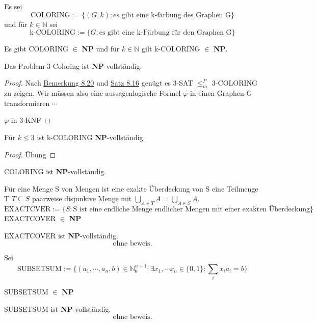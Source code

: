     Es sei 
    \[
        \text{COLORING} := \{(G,k) : \text{es gibt eine k-färbung des Graphen G}\}
    \]
    und für \(k \in \mathbb{N}\) sei
    \[
        \text{k-COLORING} := \{G : \text{es gibt eine k-Färbung für den Graphen G}\}  
    \]

    Es gibt COLORING \(\in\) \textbf{NP} und für \(k \in \mathbb{N}\) gilt k-COLORING \(\in\) \textbf{NP}.

    Das Problem 3-Coloring ist \textbf{NP}-vollständig.
    \begin{proof}
        Nach \hyperref[subsec:8.20]{Bemerkung 8.20} und \hyperref[subsec:8.16]{Satz 8.16} genügt es 3-SAT \(\leq^P_m\) 3-COLORING zu zeigen. Wir müssen also eine aussagenlogische Formel \(\varphi\) in einen Graphen G transformieren \(\cdots\)

        \(\varphi\) in 3-KNF
    \end{proof}

    Für \(k \leq 3\) ist k-COLORING \textbf{NP}-vollständig.
    \begin{proof}
        Übung
    \end{proof}

    COLORING ist \textbf{NP}-vollständig.

    Für eine Menge S von Mengen ist eine exakte Überdeckung von S eine Teilmenge T \(T \subseteq S\) paarweise disjunkive Menge mit \(\bigcup \limits_{A\in T} A = \bigcup \limits_{A \in S} A\). 
    \[
        \text{EXACTCVER} := \{S : \text{S ist eine endliche Menge endlicher Mengen mit einer exakten Überdeckung}\}  
    \]
    EXACTCOVER \(\in\) \textbf{NP}

    EXACTCOVER ist \textbf{NP}-vollständig.
    \[\text{ohne beweis.}\]

    Sei
    \[
        \text{SUBSETSUM} := \{(a_1, \cdots, a_n, b) \in \mathbb{N}_0^{n+1} : \exists x_1, \cdots x_n \in \{0,1\} : \sum_{i}^{} x_i a_i = b\}    
    \]

    SUBSETSUM \(\in\) \textbf{NP}

    SUBSETSUM ist \textbf{NP}-vollständig.
    \[\text{ohne beweis.}\]